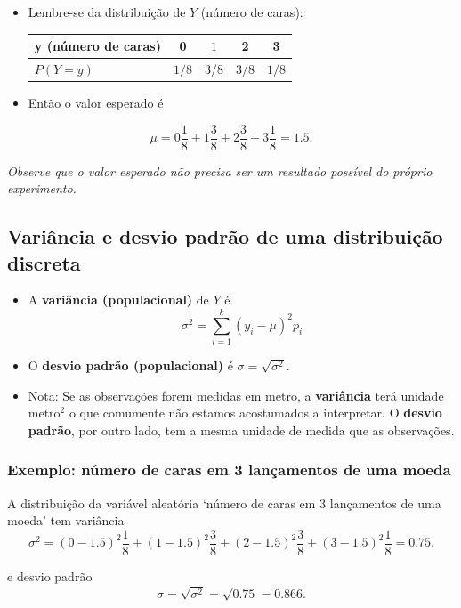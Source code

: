 \documentclass[]{article}
\providecommand{\tightlist}{%
  \setlength{\itemsep}{0pt}\setlength{\parskip}{0pt}}
\begin{document}
\begin{itemize}
\item
  Lembre-se da distribuição de \(Y\) (número de caras):

  \begin{longtable}[]{@{}lcccc@{}}
  \toprule
  y (número de caras) & 0 & \(1\) & 2 & 3\tabularnewline
  \midrule
  \endhead
  \(P(Y = y)\) & \(1/8\) & 3/8 & 3/8 & \(1/8\)\tabularnewline
  \bottomrule
  \end{longtable}
\item
  Então o valor esperado é
\end{itemize}

\[
  \mu = 0\frac{1}{8}+1\frac{3}{8}+2\frac{3}{8}+3\frac{1}{8}=1.5.
  \]

\emph{Observe que o valor esperado não precisa ser um resultado possível
do próprio experimento.}

\subsection{Variância e desvio padrão de uma distribuição
discreta}\label{variancia-e-desvio-padrao-de-uma-distribuicao-discreta}

\begin{itemize}
\tightlist
\item
  A \textbf{variância (populacional)} de \(Y\) é \[
      \sigma^2 = \sum_{i=1}^k (y_i - \mu)^2 p_i
  \]
\item
  O \textbf{desvio padrão (populacional)} é
  \(\sigma = \sqrt{\sigma^2}\).
\item
  Nota: Se as observações forem medidas em metro, a \textbf{variância}
  terá unidade \(\text{metro}^2\) o que comumente não estamos
  acostumados a interpretar. O \textbf{desvio padrão}, por outro lado,
  tem a mesma unidade de medida que as observações.
\end{itemize}

\subsubsection{Exemplo: número de caras em 3 lançamentos de uma
moeda}\label{exemplo-numero-de-caras-em-3-lancamentos-de-uma-moeda-1}

A distribuição da variável aleatória `número de caras em 3 lançamentos
de uma moeda' tem variância \[ \sigma^2
    = (0-1.5)^2\frac{1}{8} + (1-1.5)^2\frac{3}{8} + (2-1.5)^2 \frac{3}{8} + (3-1.5)^2 \frac{1}{8} = 0.75.
    \]

e desvio padrão \[  \sigma = \sqrt{\sigma^2} = \sqrt{0.75} = 0.866.  \]
\end{document}
